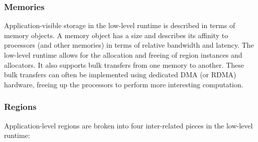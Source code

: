 \subsubsection{Memories}
\label{subsec:memories}
Application-visible storage in the low-level runtime is described in terms of
memory objects.  A memory object has a size and describes its affinity to 
processors (and other memories) in terms of relative bandwidth and latency.
The low-level runtime allows for the allocation and freeing of region instances
and allocators.  It also supports bulk transfers from one memory to another.
These bulk transfers can often be implemented using dedicated DMA (or RDMA)
hardware, freeing up the processors to perform more interesting
computation. 

\subsubsection{Regions}
\label{subsec:regionmeta}
Application-level regions are broken into four inter-related pieces in the
low-level runtime:
